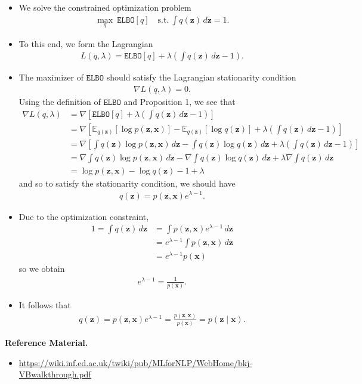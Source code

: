 \documentclass[10pt]{article}
\newcommand{\EE}{\mathbb{E}}
\newcommand{\elbo}{\texttt{ELBO}}
\begin{document}
\begin{itemize}
\item We solve the constrained optimization problem
\begin{align*}
\max_q \ \elbo[q] \quad \text{s.t.} \ \int q(\bm{z}) \, d\bm{z} = 1.
\end{align*}
\item To this end, we form the Lagrangian
\begin{align*}
L(q,\lambda) = \elbo[q] + \lambda \left( \int q(\bm{z}) \, d\bm{z} - 1 \right).
\end{align*}
\item The maximizer of $\elbo$ should satisfy the Lagrangian stationarity condition
\begin{align*}
\nabla L(q,\lambda) = 0.
\end{align*}
Using the definition of $\elbo$ and Proposition 1, we see that
\begin{align*}
\nabla L(q,\lambda) &= \nabla \left[ \elbo[q] + \lambda \left( \int q(\bm{z}) \, d\bm{z} - 1 \right) \right] \\
&= \nabla \left[ \EE_{q(\bm{z})}[\log p(\bm{z},\bm{x})] - \EE_{q(\bm{z})}[\log q(\bm{z})] + \lambda \left( \int q(\bm{z}) \, d\bm{z} - 1 \right) \right] \\
&= \nabla \left[ \int q(\bm{z}) \log p(\bm{z},\bm{x}) \, d\bm{z} - \int q(\bm{z}) \log q(\bm{z}) \, d\bm{z} + \lambda \left( \int q(\bm{z}) \, d\bm{z} - 1 \right) \right] \\
&= \nabla \int q(\bm{z}) \log p(\bm{z},\bm{x}) \, d\bm{z} - \nabla \int q(\bm{z}) \log q(\bm{z}) \, d\bm{z} + \lambda \nabla \int q(\bm{z}) \, d\bm{z} \\
&= \log p(\bm{z}, \bm{x}) - \log q(\bm{z}) - 1 + \lambda
\end{align*}
and so to satisfy the stationarity condition, we should have
\begin{align*}
q(\bm{z}) = p(\bm{z},\bm{x})e^{\lambda - 1}.
\end{align*}
\item Due to the optimization constraint,
\begin{align*}
1 = \int q(\bm{z}) \, d\bm{z} &= \int p(\bm{z},\bm{x})e^{\lambda - 1} \, d\bm{z} \\
&= e^{\lambda - 1} \int p(\bm{z},\bm{x}) \, d\bm{z} \\
&= e^{\lambda - 1} p(\bm{x})
\end{align*}
so we obtain
\begin{align*}
e^{\lambda - 1} = \frac{1}{p(\bm{x})}.
\end{align*}
\item It follows that
\begin{align*}
q(\bm{z}) = p(\bm{z},\bm{x})e^{\lambda - 1} = \frac{p(\bm{z},\bm{x})}{p(\bm{x})} = p(\bm{z} \mid \bm{x}).
\end{align*}
\end{itemize}

\textbf{Reference Material.}
\begin{itemize}
\item \url{https://wiki.inf.ed.ac.uk/twiki/pub/MLforNLP/WebHome/bkj-VBwalkthrough.pdf}
\end{itemize}
\end{document}
